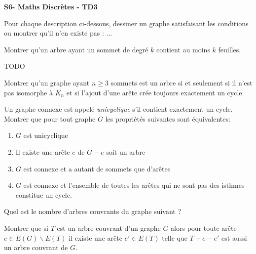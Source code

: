 \documentclass[french]{report}
\begin{document}
\begin{center}
    \huge{\textbf{S6- Maths Discrètes - TD3}}
\end{center}

\begin{exo}
    Pour chaque description ci-dessous, dessiner un graphe satisfaisant les conditions
    ou montrer qu'il n'en existe pas :
    ...
\end{exo}

\begin{exo}
    Montrer qu'un arbre ayant un sommet de degré \(k\) contient au moins \(k\)
    feuilles.
\end{exo}

\begin{exo}
    TODO
\end{exo}

\begin{exo}
    Montrer qu'un graphe ayant \(n\geq 3\) sommets est un arbre si et seulement
    si il n'est pas isomorphe à \(K_n\) et si l'ajout d'une arête crée toujours
    exactement un cycle.
\end{exo}

\begin{exo}
    Un graphe connexe est appelé \emph{unicyclique} s'il contient exactement
    un cycle. Montrer que pour tout graphe \(G\) les propriétés suivantes
    sont équivalentes:
    \begin{enumerate}
        \item \(G\) est unicyclique
        \item Il existe une arête \(e\) de \(G-e\) soit un arbre
        \item \(G\) est connexe et a autant de sommets que d'arêtes
        \item \(G\) est connexe et l'ensemble de toutes les arêtes qui ne sont pas
        des isthmes constitue un cycle.
    \end{enumerate}
\end{exo}

\begin{exo}
    Quel est le nombre d'arbres couvrants du graphe suivant ?
\end{exo}

\begin{exo}
    Montrer que si \(T\) est un arbre couvrant d'un graphe \(G\) alors pour toute
    arête \(e\in E(G)\backslash E(T)\) il existe une arête \(e'\in E(T)\) telle que
    \(T+e-e'\) est aussi un arbre couvrant de \(G\).
\end{exo}
\end{document}
